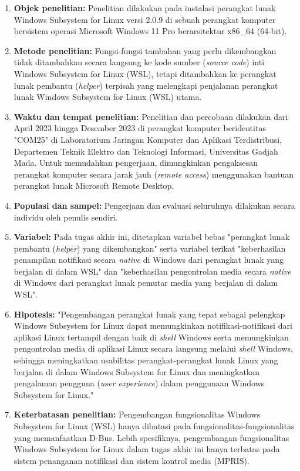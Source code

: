 \begin{enumerate}
    \item \textbf{Objek penelitian:} Penelitian dilakukan pada instalasi perangkat lunak Windows Subsystem for Linux versi 2.0.9 di sebuah perangkat komputer bersistem operasi Microsoft Windows 11 Pro berarsitektur x86\_64 (64-bit).
    
    \item \textbf{Metode penelitian:} Fungsi-fungsi tambahan yang perlu dikembangkan tidak ditambahkan secara langsung ke kode sumber (\textit{source code}) inti Windows Subsystem for Linux (WSL), tetapi ditambahkan ke perangkat lunak pembantu (\textit{helper}) terpisah yang melengkapi penjalanan perangkat lunak Windows Subsystem for Linux (WSL) utama.
    
    \item \textbf{Waktu dan tempat penelitian:} Penelitian dan percobaan dilakukan dari April 2023 hingga Desember 2023 di perangkat komputer beridentitas "COM25" di Laboratorium Jaringan Komputer dan Aplikasi Terdistribusi, Departemen Teknik Elektro dan Teknologi Informasi, Universitas Gadjah Mada. Untuk memudahkan pengerjaan, dimungkinkan pengaksesan perangkat komputer secara jarak jauh (\textit{remote access}) menggunakan bantuan perangkat lunak Microsoft Remote Desktop.
    
    \item \textbf{Populasi dan sampel:} Pengerjaan dan evaluasi seluruhnya dilakukan secara individu oleh penulis sendiri.
    
    \item \textbf{Variabel:} Pada tugas akhir ini, ditetapkan variabel bebas "perangkat lunak pembantu (\textit{helper}) yang dikembangkan" serta variabel terikat "keberhasilan penampilan notifikasi secara \textit{native} di Windows dari perangkat lunak yang berjalan di dalam WSL" dan "keberhasilan pengontrolan media secara \textit{native} di Windows dari perangkat lunak pemutar media yang berjalan di dalam WSL".
    
    \item \textbf{Hipotesis:} "Pengembangan perangkat lunak yang tepat sebagai pelengkap Windows Subsystem for Linux dapat memungkinkan notifikasi-notifikasi dari aplikasi Linux tertampil dengan baik di \textit{shell} Windows serta memungkinkan pengontrolan media di aplikasi Linux secara langsung melalui \textit{shell} Windows, sehingga meningkatkan usabilitas perangkat-perangkat lunak Linux yang berjalan di dalam Windows Subsystem for Linux dan meningkatkan pengalaman pengguna (\textit{user experience}) dalam penggunaan Windows Subsystem for Linux."
        
    \item \textbf{Keterbatasan penelitian:} Pengembangan fungsionalitas Windows Subsystem for Linux (WSL) hanya dibatasi pada fungsionalitas-fungsionalitas yang memanfaatkan D-Bus. Lebih spesifiknya, pengembangan fungsionalitas Windows Subsystem for Linux dalam tugas akhir ini hanya terbatas pada sistem penanganan notifikasi dan sistem kontrol media (MPRIS).
\end{enumerate}


